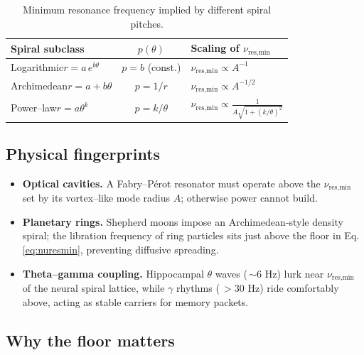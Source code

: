 \begin{table}[h]
\centering
\begin{tabular}{@{}lcl@{}}
\toprule
\textbf{Spiral subclass} & $p(\theta)$ & Scaling of $\nu_{\text{res,min}}$ \\ 
\midrule
Logarithmic\;\;$r=a\,e^{b\theta}$     & $p=b$ (const.)        & $\nu_{\text{res,min}}\propto A^{-1}$ \\
Archimedean\;\;$r=a+b\theta$          & $p=1/r$               & $\nu_{\text{res,min}}\propto A^{-1/2}$ \\
Power--law\;\;$r=a\theta^{k}$         & $p=k/\theta$          & $\displaystyle
  \nu_{\text{res,min}}\propto
  \frac{1}{A\sqrt{1+(k/\theta)^2}}$ \\ 
\bottomrule
\end{tabular}
\caption{Minimum resonance frequency implied by different spiral pitches.}
\end{table}

\subsection{Physical fingerprints}

\begin{itemize}
\item \textbf{Optical cavities.}  A Fabry–Pérot resonator must operate
      above the $\nu_{\text{res,min}}$ set by its vortex–like mode radius
      $A$; otherwise power cannot build.

\item \textbf{Planetary rings.}  Shepherd moons impose an Archimedean‐style
      density spiral; the libration frequency of ring particles sits just
      above the floor in Eq.\,\eqref{eq:nuresmin}, preventing diffusive
      spreading.

\item \textbf{Theta--gamma coupling.}  Hippocampal $\theta$ waves (\,$\sim6$ Hz)
      lurk near $\nu_{\text{res,min}}$ of the neural spiral lattice, while
      $\gamma$ rhythms (\,$>\!30$ Hz) ride comfortably above, acting as stable
      carriers for memory packets.
\end{itemize}

\subsection{Why the floor matters}


